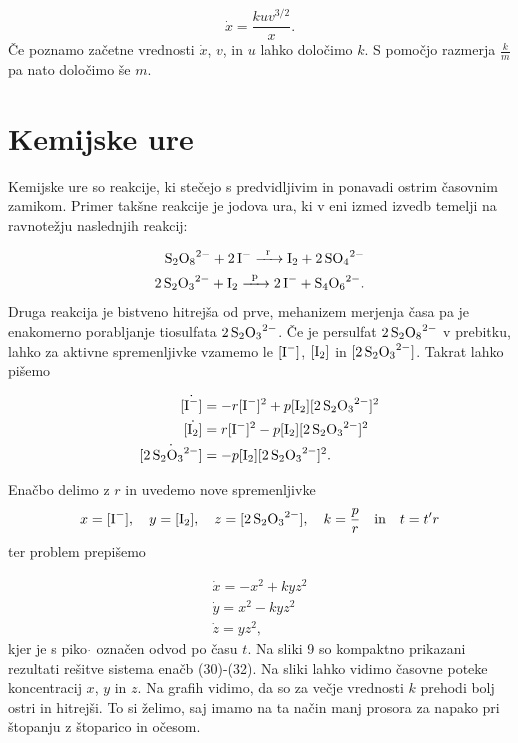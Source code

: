 \documentclass[slovene,11pt,a4paper]{article}
\begin{document}
\begin{equation}
\dot{x} = \frac{kuv^{3/2}}{x}.
\end{equation}
Če poznamo začetne vrednosti $\dot{x}$, $v$, in $u$ lahko določimo $k$. S pomočjo razmerja $\frac{k}{m}$ pa nato določimo še $m$.


\section{Kemijske ure}

Kemijske ure so reakcije, ki stečejo s predvidljivim in ponavadi ostrim časovnim zamikom. Primer takšne reakcije je jodova ura, ki v eni izmed izvedb temelji na ravnotežju naslednjih reakcij:

\begin{align}
\ce{S2O8^{2-} + 2I- ->[r] I2 + 2SO4^{2-}} \\
\ce{2S2O3^{2-} + I2 ->[p] 2I- + S4O6^{2-}}.
\end{align}
Druga reakcija je bistveno hitrejša od prve, mehanizem merjenja časa pa je enakomerno porabljanje tiosulfata $\ce{2S2O3^{2-}}$. Če je persulfat $\ce{2S2O8^{2-}}$ v prebitku, lahko za aktivne spremenljivke vzamemo le $[\ce{I-}]$, $[\ce{I2}]$ in $[\ce{2S2O3^{2-}}]$. Takrat lahko pišemo

\begin{align}
\dot{[\ce{I-}]} &= -r [\ce{I-}]^2 + p[\ce{I2}][\ce{2S2O3^{2-}}]^2 \\
\dot{[\ce{I2}]} &= r [\ce{I-}]^2 - p[\ce{I2}][\ce{2S2O3^{2-}}]^2 \\
\dot{[\ce{2S2O3^{2-}}]} &= -p[\ce{I2}][\ce{2S2O3^{2-}}]^2.
\end{align}

Enačbo delimo z $r$ in uvedemo nove spremenljivke
\[
x = [\ce{I-}], \quad y = [\ce{I2}], \quad z =[\ce{2S2O3^{2-}}], \quad k = \frac{p}{r}
\quad \text{in} \quad t = t'r
\]
ter problem prepišemo

\begin{align}
\dot{x} = -x^2 + kyz^2 \\
\dot{y} = x^2 - kyz^2 \\
\dot{z} = yz^2,
\end{align}
kjer je s piko $\dot{}$ označen odvod po času $t$. Na sliki 9 so kompaktno prikazani rezultati rešitve sistema enačb (30)-(32). Na sliki lahko vidimo časovne poteke koncentracij $x$, $y$ in $z$. Na grafih vidimo, da so za večje vrednosti $k$ prehodi bolj ostri in hitrejši. To si želimo, saj imamo na ta način manj prosora za napako pri štopanju z štoparico in očesom.
\end{document}
